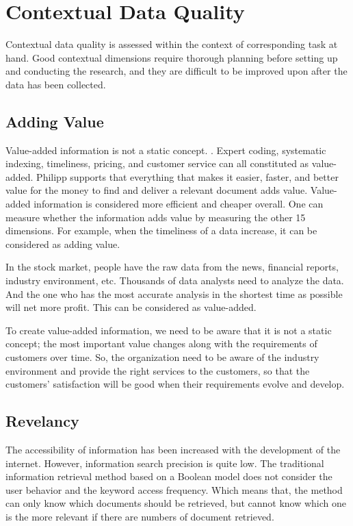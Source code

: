 \chapter{Contextual Data Quality}

Contextual data quality is assessed within the context of corresponding task at hand. \cite{tress} Good contextual dimensions require thorough planning before setting up and conducting the research, and they are difficult to be improved upon after the data has been collected.

\section{Adding Value}

Value-added information is not a static concept. \cite{philipp}. 
Expert coding, systematic indexing, timeliness, pricing, and customer service can all constituted as value-added. 
Philipp supports that everything that makes it easier, faster, and better value for the
money to find and deliver a relevant document adds value. 
Value-added information is considered more efficient and cheaper overall.
One can measure whether the information adds value by measuring the other 15 dimensions.
For example, when the timeliness of a data increase, it can be considered as adding value. 

In the stock market, people have the raw data from the news, financial reports, industry environment, etc. 
Thousands of data analysts need to analyze the data.
And the one who has the most accurate analysis in the shortest time as possible will net more profit.
This can be considered as value-added. 
    
To create value-added information, we need to be aware that it is not a static concept; 
the most important value changes along with the requirements of customers over time.
So, the organization need to be aware of the industry environment and provide the right services 
to the customers, so that the customers’ satisfaction will be good when their requirements evolve and develop. 


\section{Revelancy}

The accessibility of information has been increased with the development of the internet. However, information search precision
is quite low. \cite{peng} The traditional information retrieval method based on a Boolean model does not consider the 
user behavior and the keyword access frequency. 
Which means that, the method can only know which documents should be retrieved,
but cannot know which one is the more relevant if there are numbers of document retrieved.


